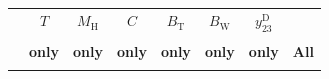 \documentclass[12pt,a4paper,twoside]{article}
\newcommand{\ytwothree}   {\ensuremath{y^{\mathrm{D}}_{23}}}
\begin{document}
\begin{table}[p]
\begin{center}
{\small
\begin{tabular}{|r||r r r r r r|| r|}
\hline
 & \multicolumn{1}{|c}{\boldmath $T$}
 & \multicolumn{1}{c}{\boldmath $M_\mathrm{H}$}
 & \multicolumn{1}{c}{\boldmath $C$}
 & \multicolumn{1}{c}{\boldmath $B_\mathrm{T}$}
 & \multicolumn{1}{c}{\boldmath $B_\mathrm{W}$}
 & \multicolumn{1}{c||}{\boldmath $\ytwothree$}
 & \\
 & & & & & & & \vspace{-0.55cm} \\
 & \multicolumn{1}{|c}{\textbf{only}}
 & \multicolumn{1}{c}{\textbf{only}}
 & \multicolumn{1}{c}{\textbf{only}}
 & \multicolumn{1}{c}{\textbf{only}}
 & \multicolumn{1}{c}{\textbf{only}}
 & \multicolumn{1}{c||}{\textbf{only}}
 & \multicolumn{1}{c|}{\textbf{All}} 

\bigstrut[b]
\\
\hline
\bigstrut[t]


\end{tabular}}
\end{center}
\end{table}
\end{document}
